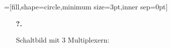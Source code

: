 \documentclass[a4paper,10pt]{scrartcl}
\author{\authorinfo}
\title{\titleinfo}
\date{\today}
\begin{document}
\setcounter{secnumdepth}{0}
\maketitle

\setcounter{MaxMatrixCols}{31}


=[fill,shape=circle,minimum size=3pt,inner sep=0pt]

\newcommand*{\oline}[1]{\overline{\vphantom{A}#1}}

\begin{enumerate}
    \item[\textbf{?.}]
    \begin{enumerate}
        Schaltbild mit 3 Multiplexern:


\end{enumerate}
\end{enumerate}
\end{document}

